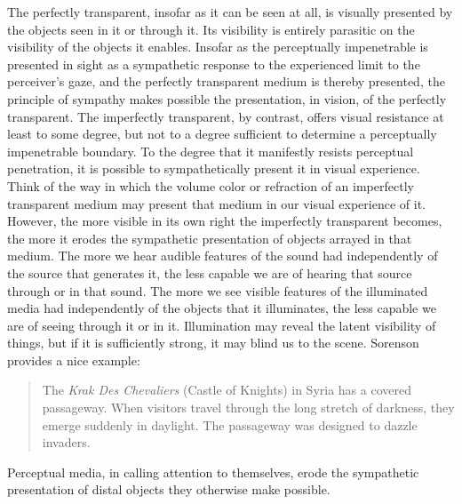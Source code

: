 The perfectly transparent, insofar as it can be seen at all, is visually presented by the objects seen in it or through it. Its visibility is entirely parasitic on the visibility of the objects it enables. Insofar as the perceptually impenetrable is presented in sight as a sympathetic response to the experienced limit to the perceiver's gaze, and the perfectly transparent medium is thereby presented, the principle of sympathy makes possible the presentation, in vision, of the perfectly transparent. The imperfectly transparent, by contrast, offers visual resistance at least to some degree, but not to a degree sufficient to determine a perceptually impenetrable boundary. To the degree that it manifestly resists perceptual penetration, it is possible to sympathetically present it in visual experience. Think of the way in which the volume color or refraction of an imperfectly transparent medium may present that medium in our visual experience of it. However, the more visible in its own right the imperfectly transparent becomes, the more it erodes the sympathetic presentation of objects arrayed in that medium. The more we hear audible features of the sound had independently of the source that generates it, the less capable we are of hearing that source through or in that sound. The more we see visible features of the illuminated media had independently of the objects that it illuminates, the less capable we are of seeing through it or in it. Illumination may reveal the latent visibility of things, but if it is sufficiently strong, it may blind us to the scene. Sorenson provides a nice example:
\begin{quote}
	The \emph{Krak Des Chevaliers} (Castle of Knights) in Syria has a covered passageway. When visitors travel through the long stretch of darkness, they emerge suddenly in daylight. The passageway was designed to dazzle invaders. \citep[6]{Sorensen:2008kx}
\end{quote} 
Perceptual media, in calling attention to themselves, erode the sympathetic presentation of distal objects they otherwise make possible.

